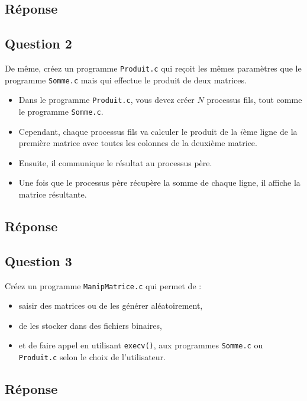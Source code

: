 \documentclass[
	12pt, %
]{fphw}
\begin{document}
\subsection*{Réponse}
\subsection*{Question 2}
\begin{problem}
De même, créez un programme \texttt{Produit.c} qui reçoit les mêmes paramètres que le programme \texttt{Somme.c} mais qui effectue le produit de deux matrices. 
\begin{itemize}
	\item Dans le programme \texttt{Produit.c}, vous devez créer $N$ processus fils, tout comme le programme \texttt{Somme.c}.
	\item Cependant, chaque processus fils va calculer le produit de la $i$ème ligne de la première matrice avec toutes les colonnes de la deuxième matrice.
	\item Ensuite, il communique le résultat au processus père.
	\item Une fois que le processus père récupère la somme de chaque ligne, il affiche la matrice résultante.
\end{itemize}
\end{problem}
\subsection*{Réponse}
\subsection*{Question 3}
\begin{problem}
Créez un programme \texttt{ManipMatrice.c} qui permet de :
	\begin{itemize}
		\item saisir des matrices ou de les générer aléatoirement,
		\item de les stocker dans des fichiers binaires,
		\item et de faire appel en utilisant \texttt{execv()}, aux programmes \texttt{Somme.c} ou \texttt{Produit.c} selon le choix de l'utilisateur.
	\end{itemize}
\end{problem}
\subsection*{Réponse}
\end{document}
